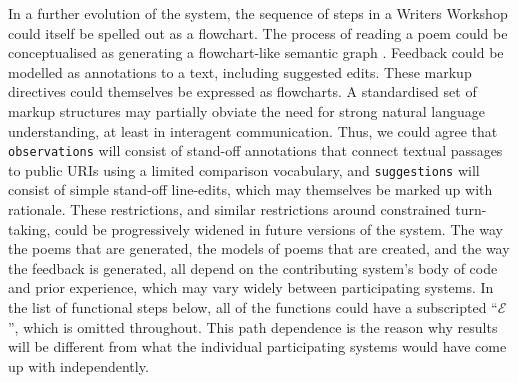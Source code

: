 In a further evolution of the system, the sequence of steps in a
Writers Workshop could itself be spelled out as a flowchart.  The
process of reading a poem could be conceptualised as generating a
flowchart-like semantic graph  \cite{harrington2007asknet,francisco2006automated}.  Feedback could be modelled as
annotations to a text, including suggested edits.  These markup
directives could themselves be expressed as flowcharts.
A standardised set of markup structures may
partially obviate the need for strong natural language understanding, at
least in interagent communication.  Thus, we could agree that {\tt observations} will consist
of stand-off annotations that connect textual passages to public URIs using a limited
comparison vocabulary, and {\tt suggestions} will consist of simple
stand-off line-edits, which may themselves be marked up with rationale.  These
restrictions, and similar restrictions around constrained turn-taking,
could be progressively widened in future versions of the system.
%
The way the poems that are generated, the models of poems that are
created, and the way the feedback is generated, all depend on the
contributing system's body of code and prior experience, which may
vary widely between participating systems.  In the list of functional steps below, all of
the functions could have a subscripted ``$\mathcal{E}$'', which is
omitted throughout.  This path dependence is the reason why results
will be different from what the individual participating systems would
have come up with independently.

